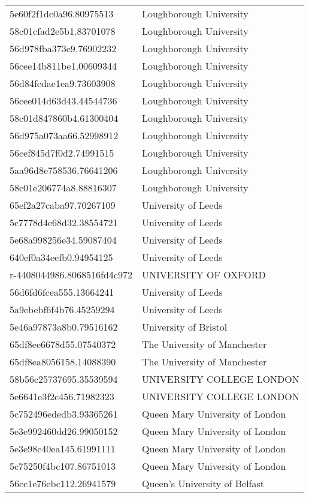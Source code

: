 \begin{tabular}{ll}
5e60f2f1dc0a96.80975513 & Loughborough University \\
58c01cfad2e5b1.83701078 & Loughborough University \\
56d978fba373e9.76902232 & Loughborough University \\
56cee14b811be1.00609344 & Loughborough University \\
56d84fcdae1ea9.73603908 & Loughborough University \\
56cee014d63d43.44544736 & Loughborough University \\
58c01d847860b4.61300404 & Loughborough University \\
56d975a073aa66.52998912 & Loughborough University \\
56cef845d7f0d2.74991515 & Loughborough University \\
5aa96d8e758536.76641206 & Loughborough University \\
58c01e206774a8.88816307 & Loughborough University \\
65ef2a27caba97.70267109 & University of Leeds \\
5c7778d4e68d32.38554721 & University of Leeds \\
5e68a998256e34.59087404 & University of Leeds \\
640ef0a34eefb0.94954125 & University of Leeds \\
r-4408044986.8068516fd4c972 & UNIVERSITY OF OXFORD \\
56d6fd6fcea555.13664241 & University of Leeds \\
5a9ebebf6f4b76.45259294 & University of Leeds \\
5e46a97873a8b0.79516162 & University of Bristol \\
65df8ee6678d55.07540372 & The University of Manchester \\
65df8ea8056158.14088390 & The University of Manchester \\
58b56c25737695.35539594 & UNIVERSITY COLLEGE LONDON \\
5e6641e3f2c456.71982323 & UNIVERSITY COLLEGE LONDON \\
5c752496ededb3.93365261 & Queen Mary University of London \\
5e3e992460dd26.99050152 & Queen Mary University of London \\
5e3e98c40ea145.61991111 & Queen Mary University of London \\
5c75250f4bc107.86751013 & Queen Mary University of London \\
56cc1e76ebc112.26941579 & Queen's University of Belfast \\

\end{tabular}
